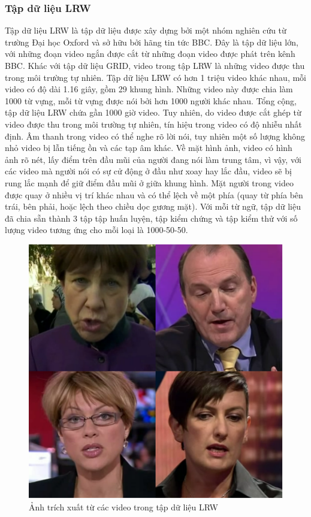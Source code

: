 \subsubsection{Tập dữ liệu LRW \cite{lrw}}

Tập dữ liệu LRW là tập dữ liệu được xây dựng bởi một nhóm nghiên cứu từ trường Đại học Oxford và sở hữu bởi hãng tin tức BBC. Đây là tập dữ liệu lớn, với những đoạn video ngắn được cắt từ những đoạn video được phát trên kênh BBC. Khác với tập dữ liệu GRID, video trong tập LRW là những video được thu trong môi trường tự nhiên. Tập dữ liệu LRW có hơn 1 triệu video khác nhau, mỗi video có độ dài 1.16 giây, gồm 29 khung hình. Những video này được chia làm 1000 từ vựng, mỗi từ vựng được nói bởi hơn 1000 người khác nhau. Tổng cộng, tập dữ liệu LRW chứa gần 1000 giờ video. Tuy nhiên, do video được cắt ghép từ video được thu trong môi trường tự nhiên, tín hiệu trong video có độ nhiễu nhất định. Âm thanh trong video có thể nghe rõ lời nói, tuy nhiên một số lượng không nhỏ video bị lẫn tiếng ồn và các tạp âm khác. Về mặt hình ảnh, video có hình ảnh rõ nét, lấy điểm trên đầu mũi của người đang nói làm trung tâm, vì vậy, với các video mà người nói có sự cử động ở đầu như xoay hay lắc đầu, video sẽ bị rung lắc mạnh để giữ điểm đầu mũi ở giữa khung hình. Mặt người trong video được quay ở nhiều vị trí khác nhau và có thể lệch về một phía (quay từ phía bên trái, bên phải, hoặc lệch theo chiều dọc gương mặt). Với mỗi từ ngữ, tập dữ liệu đã chia sẵn thành 3 tập tập huấn luyện, tập kiểm chứng và tập kiểm thử với số lượng video tương ứng cho mỗi loại là 1000-50-50.

\begin{figure}[H]
    \centering
    \includegraphics[width=12cm]{./content/materials/lrw.png}
    \caption{Ảnh trích xuất từ các video trong tập dữ liệu LRW}
\end{figure}

